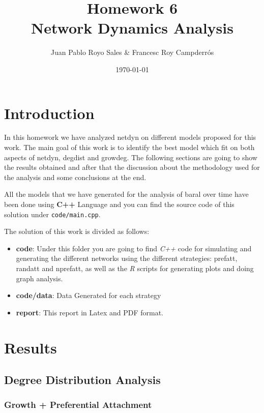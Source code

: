 \documentclass[12pt, a4paper]{article}
\title{%
      Homework 6\\
      Network Dynamics Analysis\\
}
\author{Juan Pablo Royo Sales \& Francesc Roy Campderrós}
\affil{Universitat Politècnica de Catalunya}
\date\today
\begin{document}
\maketitle

\tableofcontents

\section{Introduction}
In this homework we have analyzed \acrfull{netdyn} on different models proposed for this work.
The main goal of this work is to identify the best model which fit on both aspects of \acrshort{netdyn}, \acrfull{degdist} and \acrfull{growdeg}.
The following sections are going to show the results obtained and after that the discussion about the methodology used for the analysis and some conclusions at the end.

All the models that we have generated for the analysis of \acrfull{baral} over time have been done using \textbf{C++} Language and you can find the source code of this 
solution under \texttt{code/main.cpp}.

The solution of this work is divided as follows:

\begin{itemize}
    \item \textbf{code}: Under this folder you are going to find \textit{C++} code for simulating and generating the different networks using the different strategies: \acrfull{prefatt}, \acrfull{randatt} and \acrfull{nprefatt}, as well as the \textit{R} scripts for generating plots and doing graph analysis.
    \item \textbf{code/data}: Data Generated for each strategy
    \item \textbf{report}: This report in Latex and PDF format.
\end{itemize}

\section{Results}
\subsection{Degree Distribution Analysis}\label{deg_dist_ana}
\subsubsection{Growth + Preferential Attachment}
\end{document}

